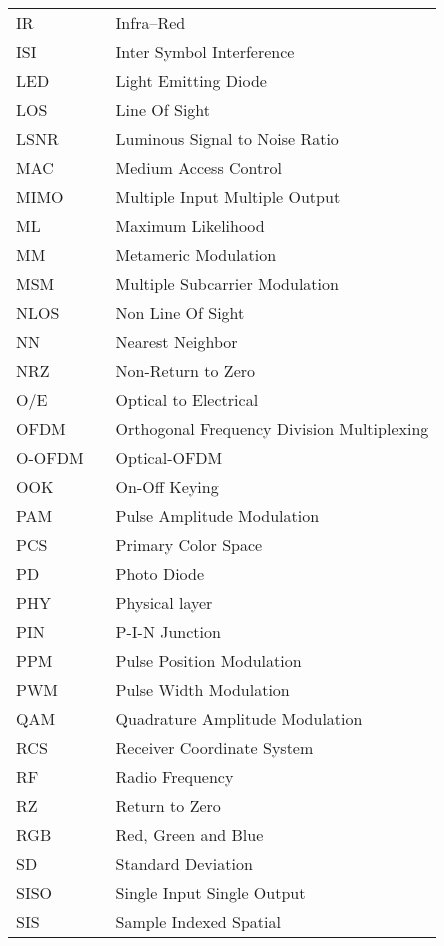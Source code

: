\begin{center}
\begin{longtable}{lll}
		IR & \dotfill & Infra--Red \\
		ISI & \dotfill & Inter Symbol Interference \\
		LED & \dotfill & Light Emitting Diode \\
		LOS & \dotfill & Line Of Sight \\
		LSNR & \dotfill & Luminous Signal to Noise Ratio \\
		MAC & \dotfill & Medium Access Control \\
		MIMO & \dotfill & Multiple Input Multiple Output \\
		ML & \dotfill & Maximum Likelihood \\
		MM & \dotfill & Metameric Modulation \\
		MSM & \dotfill & Multiple Subcarrier Modulation \\
		NLOS & \dotfill & Non Line Of Sight \\
		NN  & \dotfill & Nearest Neighbor \\
		NRZ & \dotfill & Non-Return to Zero \\
		O/E & \dotfill & Optical to Electrical \\
		OFDM  & \dotfill & Orthogonal Frequency Division Multiplexing \\
		O-OFDM  & \dotfill & Optical-OFDM \\
		OOK & \dotfill & On-Off Keying \\
		PAM & \dotfill & Pulse Amplitude Modulation \\
		PCS & \dotfill & Primary Color Space \\
		PD & \dotfill & Photo Diode \\
		PHY & \dotfill & Physical layer \\
		PIN & \dotfill & P-I-N Junction \\
		PPM & \dotfill & Pulse Position Modulation \\
		PWM & \dotfill & Pulse Width Modulation \\
		QAM & \dotfill & Quadrature Amplitude Modulation \\
		RCS & \dotfill & Receiver Coordinate System \\
    RF  & \dotfill & Radio Frequency \\
		RZ & \dotfill & Return to Zero \\
		RGB & \dotfill & Red, Green and Blue \\
		SD & \dotfill & Standard Deviation \\
		SISO & \dotfill & Single Input Single Output \\
		SIS & \dotfill & Sample Indexed Spatial \\

\end{longtable}
\end{center}
